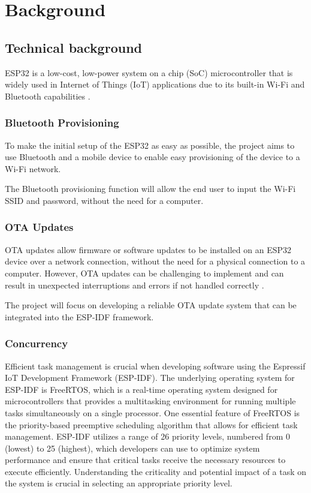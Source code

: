 \section{Background}
\label{sec:background}

\subsection{Technical background}
\label{sec:technical}
ESP32 is a low-cost, low-power system on a chip (SoC) microcontroller that is widely used in Internet of Things (IoT) applications due to its built-in Wi-Fi and Bluetooth capabilities \cite{espressif:popularity} \cite{espressif:esp32_datasheet}.

\subsubsection{Bluetooth Provisioning}
\label{subsec:bluetooth}
To make the initial setup of the ESP32 as easy as possible, the project aims to use Bluetooth and a mobile device to enable easy provisioning of the device to a Wi-Fi network.

The Bluetooth provisioning function will allow the end user to input the Wi-Fi SSID and password, without the need for a computer.

\subsubsection{OTA Updates}
\label{subsec:ota}
OTA updates allow firmware or software updates to be installed on an ESP32 device over a network connection, without the need for a physical connection to a computer. However, OTA updates can be challenging to implement and can result in unexpected interruptions and errors if not handled correctly \cite{Arakadakis:2021}.

The project will focus on developing a reliable OTA update system that can be integrated into the ESP-IDF framework.

\subsubsection{Concurrency}
\label{subsec:concurrency}
Efficient task management is crucial when developing software using the Espressif IoT Development Framework (ESP-IDF). The underlying operating system for ESP-IDF is FreeRTOS, which is a real-time operating system designed for microcontrollers that provides a multitasking environment for running multiple tasks simultaneously on a single processor. One essential feature of FreeRTOS is the priority-based preemptive scheduling algorithm that allows for efficient task management. ESP-IDF utilizes a range of 26 priority levels, numbered from 0 (lowest) to 25 (highest), which developers can use to optimize system performance and ensure that critical tasks receive the necessary resources to execute efficiently. Understanding the criticality and potential impact of a task on the system is crucial in selecting an appropriate priority level.

